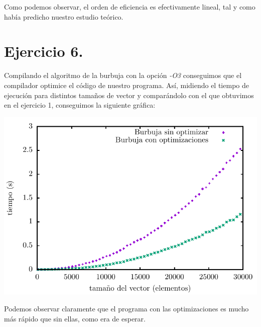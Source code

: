 \documentclass[11pt,a4paper]{article}
\begin{document}
Como podemos observar, el orden de eficiencia es efectivamente lineal, tal y como había predicho nuestro estudio teórico.

\section*{Ejercicio 6.}

Compilando el algoritmo de la burbuja con la opción \textit{-O3} conseguimos que el compilador optimice el código de nuestro programa. Así, midiendo el tiempo de ejecución para distintos tamaños de vector y comparándolo con el que obtuvimos en el ejercicio 1, conseguimos la siguiente gráfica:

\begin{center}
	\includegraphics{img/tiempos_burbuja_opt_compilador.pdf}
\end{center}

Podemos observar claramente que el programa con las optimizaciones es mucho más rápido que sin ellas, como era de esperar.
\end{document}
